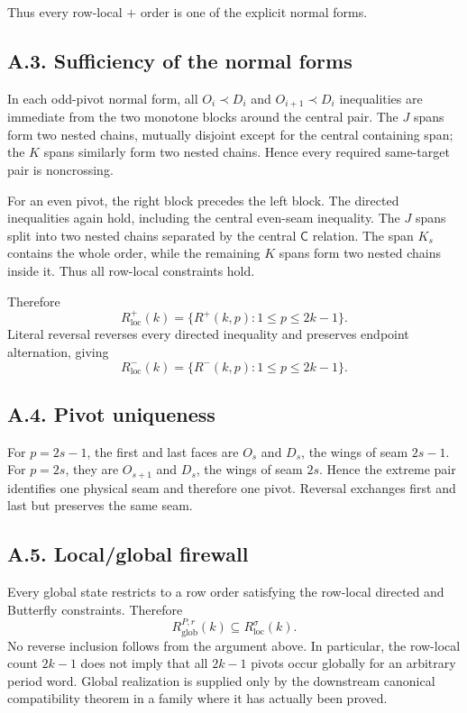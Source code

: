 \documentclass[11pt]{article}
\theoremstyle{definition}
\theoremstyle{remark}
\begin{document}
Thus every row-local \(+\) order is one of the explicit normal forms.

\subsection{A.3. Sufficiency of the normal
forms}\label{a.3.-sufficiency-of-the-normal-forms}

In each odd-pivot normal form, all \(O_i\prec D_i\) and
\(O_{i+1}\prec D_i\) inequalities are immediate from the two monotone
blocks around the central pair. The \(J\) spans form two nested chains,
mutually disjoint except for the central containing span; the \(K\)
spans similarly form two nested chains. Hence every required same-target
pair is noncrossing.

For an even pivot, the right block precedes the left block. The directed
inequalities again hold, including the central even-seam inequality. The
\(J\) spans split into two nested chains separated by the central
\(\mathsf C\) relation. The span \(K_s\) contains the whole order, while
the remaining \(K\) spans form two nested chains inside it. Thus all
row-local constraints hold.

Therefore \[
R_{\mathrm{loc}}^+(k)=\{R^+(k,p):1\le p\le2k-1\}.
\] Literal reversal reverses every directed inequality and preserves
endpoint alternation, giving \[
R_{\mathrm{loc}}^-(k)=\{R^-(k,p):1\le p\le2k-1\}.
\]

\subsection{A.4. Pivot uniqueness}\label{a.4.-pivot-uniqueness}

For \(p=2s-1\), the first and last faces are \(O_s\) and \(D_s\), the
wings of seam \(2s-1\). For \(p=2s\), they are \(O_{s+1}\) and \(D_s\),
the wings of seam \(2s\). Hence the extreme pair identifies one physical
seam and therefore one pivot. Reversal exchanges first and last but
preserves the same seam.

\subsection{A.5. Local/global firewall}\label{a.5.-localglobal-firewall}

Every global state restricts to a row order satisfying the row-local
directed and Butterfly constraints. Therefore \[
R_{\mathrm{glob}}^{P,r}(k)\subseteq R_{\mathrm{loc}}^\sigma(k).
\] No reverse inclusion follows from the argument above. In particular,
the row-local count \(2k-1\) does not imply that all \(2k-1\) pivots
occur globally for an arbitrary period word. Global realization is
supplied only by the downstream canonical compatibility theorem in a
family where it has actually been proved.
\end{document}
